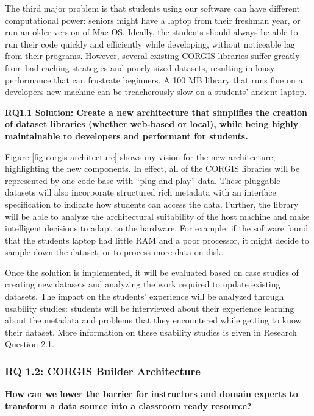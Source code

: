  The third major problem is that students using our software can have different computational power: seniors might have a laptop from their freshman year, or run an older version of Mac OS.
	Ideally, the students should always be able to run their code quickly and efficiently while developing, without noticeable lag from their programs.
    However, several existing CORGIS libraries suffer greatly from bad caching strategies and poorly sized datasets, resulting in lousy performance that can frustrate beginners.
    A 100 MB library that runs fine on a developers new machine can be treacherously slow on a students' ancient laptop.
    
    \textbf{RQ1.1 Solution: Create a new architecture that simplifies the creation of dataset libraries (whether web-based or local), while being highly maintainable to developers and performant for students.}
    
    Figure \ref{fig-corgis-architecture} shows my vision for the new architecture, highlighting the new components.
    In effect, all of the CORGIS libraries will be represented by one code base with ``plug-and-play'' data.
    These pluggable datasets will also incorporate structured rich metadata with an interface specification to indicate how students can access the data.
    Further, the library will be able to analyze the architectural suitability of the host machine and make intelligent decisions to adapt to the hardware. For example, if the software found that the students laptop had little RAM and a poor processor, it might decide to sample down the dataset, or to process more data on disk.
    
    
    Once the solution is implemented, it will be evaluated based on case studies of creating new datasets and analyzing the work required to update existing datasets. 
    The impact on the students' experience will be analyzed through usability studies: students will be interviewed about their experience learning about the metadata and problems that they encountered while getting to know their dataset.
    More information on these usability studies is given in Research Question 2.1.
    
    \subsubsection{RQ 1.2: CORGIS Builder Architecture}
    
    \textbf{How can we lower the barrier for instructors and domain experts to transform a data source into a classroom ready resource?}
    
